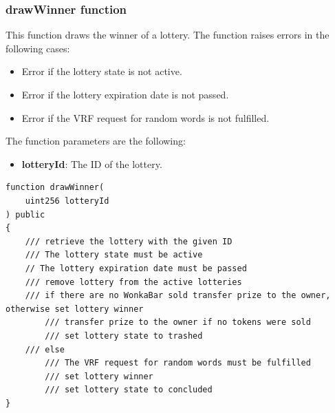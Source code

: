 \subsubsection{drawWinner function}
This function draws the winner of a lottery. The function raises errors in the following cases:
\begin{itemize}
    \item Error if the lottery state is not active.
    \item Error if the lottery expiration date is not passed.
    \item Error if the VRF request for random words is not fulfilled.
\end{itemize}
The function parameters are the following:
\begin{itemize}
    \item \textbf{lotteryId}: The ID of the lottery.
\end{itemize}
\begin{verbatim}
function drawWinner(
    uint256 lotteryId
) public 
{
    /// retrieve the lottery with the given ID
    /// The lottery state must be active
    // The lottery expiration date must be passed
    /// remove lottery from the active lotteries
    /// if there are no WonkaBar sold transfer prize to the owner, otherwise set lottery winner
        /// transfer prize to the owner if no tokens were sold
        /// set lottery state to trashed
    /// else
        /// The VRF request for random words must be fulfilled
        /// set lottery winner
        /// set lottery state to concluded
}
\end{verbatim}
